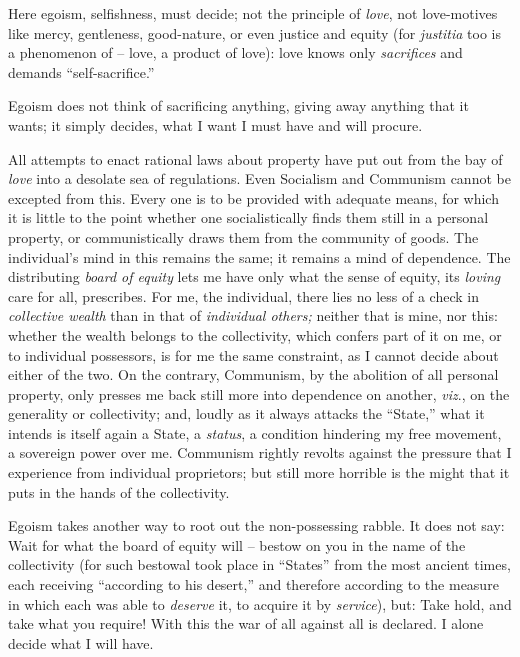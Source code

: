 Here egoism, selfishness, must decide; not the principle of \textit{love}, not 
love-motives like mercy, gentleness, good-nature, or even justice and equity 
(for \textit{justitia} too is a phenomenon of -- love, a product of love): 
love knows only \textit{sacrifices} and demands ``self-sacrifice.''

Egoism does not think of sacrificing anything, giving away anything that it 
wants; it simply decides, what I want I must have and will procure.

All attempts to enact rational laws about property have put out from the bay 
of \textit{love} into a desolate sea of regulations. Even Socialism and 
Communism cannot be excepted from this. Every one is to be provided with 
adequate means, for which it is little to the point whether one 
socialistically finds them still in a personal property, or communistically 
draws them from the community of goods. The individual's mind in this remains 
the same; it remains a mind of dependence. The distributing \textit{board of 
equity} lets me have only what the sense of equity, its \textit{loving} care 
for all, prescribes. For me, the individual, there lies no less of a check in 
\textit{collective wealth} than in that of \textit{individual others;} neither 
that is mine, nor this: whether the wealth belongs to the collectivity, which 
confers part of it on me, or to individual possessors, is for me the same 
constraint, as I cannot decide about either of the two. On the contrary, 
Communism, by the abolition of all personal property, only presses me back 
still more into dependence on another, \textit{viz}., on the generality or 
collectivity; and, loudly as it always attacks the ``State,'' what it 
intends is itself again a State, a \textit{status}, a condition hindering my 
free movement, a sovereign power over me. Communism rightly revolts against 
the pressure that I experience from individual proprietors; but still more 
horrible is the might that it puts in the hands of the collectivity.

Egoism takes another way to root out the non-possessing rabble. It does not 
say: Wait for what the board of equity will -- bestow on you in the name of 
the collectivity (for such bestowal took place in ``States'' from the most 
ancient times, each receiving ``according to his desert,'' and therefore 
according to the measure in which each was able to \textit{deserve} it, to 
acquire it by \textit{service}), but: Take hold, and take what you require! 
With this the war of all against all is declared. I alone decide what I will 
have.

